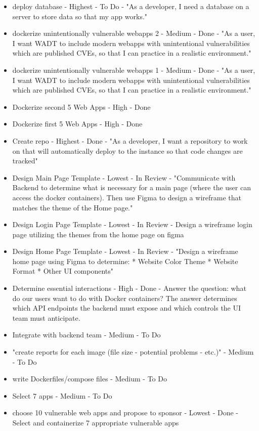 \documentclass[12pt,titlepage]{article}
\begin{document}
\begin{itemize}
	\item deploy database - Highest - To Do - "As a developer, I need a database on a server to store data so that my app works."
	\item dockerize unintentionally vulnerable webapps 2 - Medium - Done - "As a user, I want WADT to include modern webapps with unintentional vulnerabilities which are published CVEs, so that I can practice in a realistic environment."
	\item dockerize unintentionally vulnerable webapps 1 - Medium - Done - "As a user, I want WADT to include modern webapps with unintentional vulnerabilities which are published CVEs, so that I can practice in a realistic environment."
	\item Dockerize second 5 Web Apps - High - Done
	\item Dockerize first 5 Web Apps - High - Done
	\item Create repo - Highest - Done - "As a developer, I want a repository to work on that will automatically deploy to the instance so that code changes are tracked"
	\item Design Main Page Template - Lowest - In Review - "Communicate with Backend to determine what is necessary for a main page (where the user can access the docker containers). Then use Figma to design a wireframe that matches the theme of the Home page."
	\item Design Login Page Template - Lowest - In Review - Design a wireframe login page utilizing the themes from the home page on figma
	\item Design Home Page Template - Lowest - In Review - "Design a wireframe home page using Figma to determine: * Website Color Theme * Website Format * Other UI components"
	\item Determine essential interactions - High - Done - Answer the question: what do our users want to do with Docker containers? The answer determines which API endpoints the backend must expose and which controls the UI team must anticipate.
	\item Integrate with backend team - Medium - To Do
	\item "create reports for each image (file size -  potential problems -  etc.)" - Medium - To Do
	\item write Dockerfiles/compose files - Medium - To Do
	\item Select 7 apps - Medium - To Do
	\item choose 10 vulnerable web apps and propose to sponsor - Lowest - Done - Select and containerize 7 appropriate vulnerable apps

\end{itemize}
\end{document}
